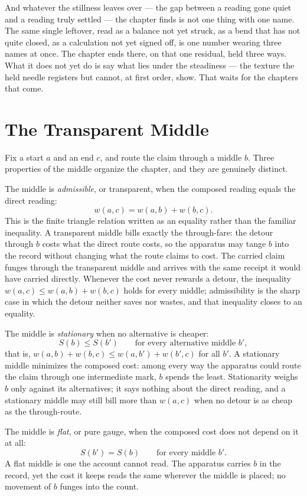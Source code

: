 And whatever the stillness leaves over --- the gap between a reading gone quiet and a reading truly settled --- the chapter finds is not one thing with one name. The same single leftover, read as a balance not yet struck, as a bend that has not quite closed, as a calculation not yet signed off, is one number wearing three names at once. The chapter ends there, on that one residual, held three ways. What it does not yet do is say what lies under the steadiness --- the texture the held needle registers but cannot, at first order, show. That waits for the chapters that come.

\section{The Transparent Middle}

Fix a start $a$ and an end $c$, and route the claim through a middle $b$. Three properties of the middle organize the chapter, and they are genuinely distinct.

The middle is \emph{admissible}, or transparent, when the composed reading equals the direct reading:
\[
  w(a,c) = w(a,b) + w(b,c).
\]
This is the finite triangle relation written as an equality rather than the familiar inequality. A transparent middle bills exactly the through-fare: the detour through $b$ costs what the direct route costs, so the apparatus may tange $b$ into the record without changing what the route claims to cost. The carried claim funges through the transparent middle and arrives with the same receipt it would have carried directly. Whenever the cost never rewards a detour, the inequality $w(a,c) \le w(a,b) + w(b,c)$ holds for every middle; admissibility is the sharp case in which the detour neither saves nor wastes, and that inequality closes to an equality.

The middle is \emph{stationary} when no alternative is cheaper:
\[
  S(b) \le S(b') \qquad \text{for every alternative middle } b',
\]
that is, $w(a,b) + w(b,c) \le w(a,b') + w(b',c)$ for all $b'$. A stationary middle minimizes the composed cost: among every way the apparatus could route the claim through one intermediate mark, $b$ spends the least. Stationarity weighs $b$ only against its alternatives; it says nothing about the direct reading, and a stationary middle may still bill more than $w(a,c)$ when no detour is as cheap as the through-route.

The middle is \emph{flat}, or pure gauge, when the composed cost does not depend on it at all:
\[
  S(b') = S(b) \qquad \text{for every middle } b'.
\]
A flat middle is one the account cannot read. The apparatus carries $b$ in the record, yet the cost it keeps reads the same wherever the middle is placed; no movement of $b$ funges into the count.

